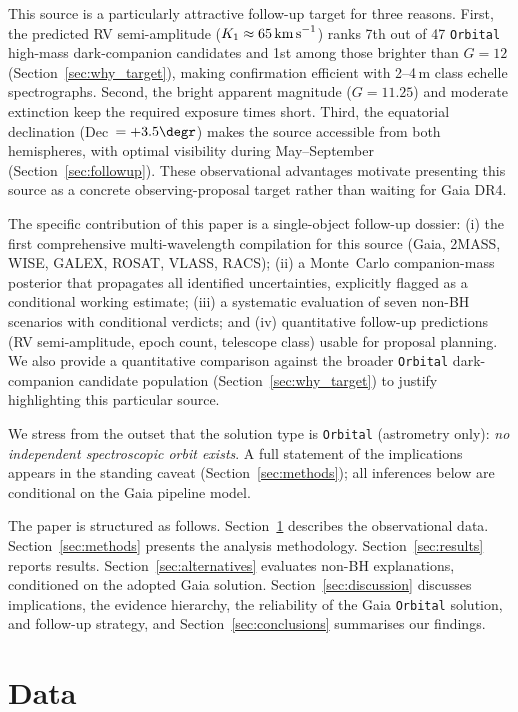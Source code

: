 \documentclass[usenatbib,fleqn]{mnras}
\newcommand{\kms}{{\rm km\,s}^{-1}}
\begin{document}
This source is a particularly attractive follow-up target for
three reasons.  First, the predicted RV semi-amplitude
($K_1 \approx 65\,\kms$) ranks 7th out of 47 \texttt{Orbital}
high-mass dark-companion candidates and 1st among those brighter than $G = 12$
(Section~\ref{sec:why_target}), making
confirmation efficient with 2--4\,m class echelle spectrographs.
Second, the bright apparent magnitude ($G = 11.25$) and moderate
extinction keep the required exposure times short.  Third, the
equatorial declination (Dec~$= +3.5\degr$) makes the source
accessible from both hemispheres, with optimal visibility
during May--September (Section~\ref{sec:followup}).  These
observational advantages motivate presenting this source as a
concrete observing-proposal target rather than waiting for Gaia
DR4.

The specific contribution of this paper is a single-object
follow-up dossier: (i) the first comprehensive multi-wavelength
compilation for this source (Gaia, 2MASS, WISE, GALEX, ROSAT,
VLASS, RACS); (ii) a Monte~Carlo companion-mass posterior that
propagates all identified uncertainties, explicitly flagged as a
conditional working estimate; (iii) a systematic evaluation of
seven non-BH scenarios with conditional verdicts; and (iv)
quantitative follow-up predictions (RV semi-amplitude, epoch
count, telescope class) usable for proposal planning.
We also provide a quantitative comparison against the broader
\texttt{Orbital} dark-companion candidate population
(Section~\ref{sec:why_target}) to justify highlighting this
particular source.

We stress from the outset that the solution type is
\texttt{Orbital} (astrometry only): \emph{no independent
spectroscopic orbit exists}.  A full statement of the
implications appears in the standing caveat
(Section~\ref{sec:methods}); all inferences below are
conditional on the Gaia pipeline model.

The paper is structured as follows.  Section~\ref{sec:data}
describes the observational data.  Section~\ref{sec:methods}
presents the analysis methodology.  Section~\ref{sec:results}
reports results.  Section~\ref{sec:alternatives} evaluates
non-BH explanations, conditioned on the adopted Gaia solution.
Section~\ref{sec:discussion} discusses
implications, the evidence hierarchy, the reliability of the
Gaia \texttt{Orbital} solution, and follow-up strategy, and
Section~\ref{sec:conclusions} summarises our findings.

\section{Data}
\label{sec:data}
\end{document}
